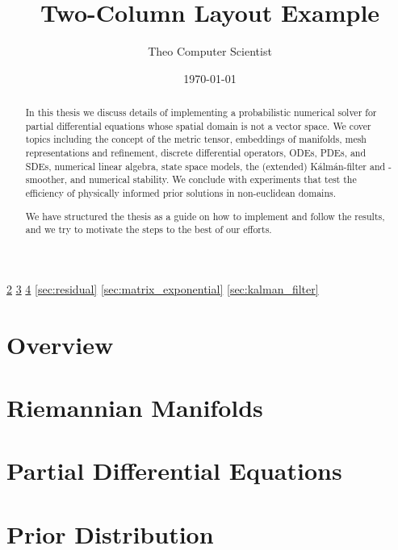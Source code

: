 
\def\COMPILINGFROMMAIN{}


\title{Two-Column Layout Example}
\author{Theo Computer Scientist}
\date{\today}
\maketitle


\begin{abstract}
In this thesis we discuss details of implementing a probabilistic numerical solver for partial differential equations whose spatial domain is not a vector space. We cover topics including the concept of the metric tensor, embeddings of manifolds, mesh representations and refinement, discrete differential operators, ODEs, PDEs, and SDEs, numerical linear algebra, state space models, the (extended) Kálmán-filter and -smoother, and numerical stability. We conclude with experiments that test the efficiency of physically informed prior solutions in non-euclidean domains.

We have structured the thesis as a guide on how to implement and follow the results, and we try to motivate the steps to the best of our efforts.
\end{abstract}

\ref{sec:manifolds}
\ref{sec:pde}
\ref{sec:prior}
\ref{sec:residual}
\ref{sec:matrix_exponential}
\ref{sec:kalman_filter}

\newpage
\section{Overview}\label{sec:overview}


\newpage
\section{Riemannian Manifolds}\label{sec:manifolds}


\newpage
\section{Partial Differential Equations}\label{sec:pde}


\newpage
\section{Prior Distribution}\label{sec:prior}


